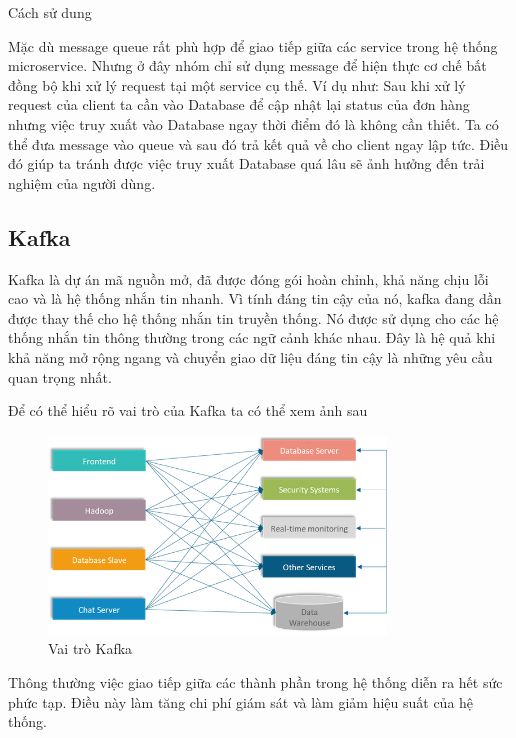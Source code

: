 \begin{itemize}
            Cách sử dung
            
            Mặc dù message queue rất phù hợp để giao tiếp giữa các service trong hệ thống microservice. Nhưng ở đây nhóm chỉ sử dụng message để hiện thực cơ chế bất đồng bộ khi xử lý request tại một service cụ thế. Ví dụ như: Sau khi xử lý request của client ta cần vào Database để cập nhật lại status của đơn hàng nhưng việc truy xuất vào Database ngay thời điểm đó là không cần thiết. Ta có thể đưa message vào queue và sau đó trả kết quả về cho client ngay lập tức. Điều đó giúp ta tránh được việc truy xuất Database quá lâu sẽ ảnh hưởng đến trải nghiệm của người dùng.
            
            \subsection{Kafka}
            
            Kafka là dự án mã nguồn mở, đã được đóng gói hoàn chỉnh, khả năng chịu lỗi cao và là hệ thống nhắn tin nhanh. Vì tính đáng tin cậy của nó, kafka đang dần được thay thế cho hệ thống nhắn tin truyền thống. Nó được sử dụng cho các hệ thống nhắn tin thông thường trong các ngữ cảnh khác nhau. Đây là hệ quả khi khả năng mở rộng ngang và chuyển giao dữ liệu đáng tin cậy là những yêu cầu quan trọng nhất.
            
            Để có thể hiểu rõ vai trò của Kafka ta có thể xem ảnh sau
            
            \begin{figure}[!ht]   			\includegraphics[width=0.8\textwidth]{Images/Kafka1.png}
    		\centering
    		\linebreak
    		\caption{Vai trò Kafka}
            \end{figure}
            
            Thông thường việc giao tiếp giữa các thành phần trong hệ thống diễn ra hết sức phức tạp. Điều này làm tăng chi phí giám sát và làm giảm hiệu suất của hệ thống.
            

\end{itemize}
